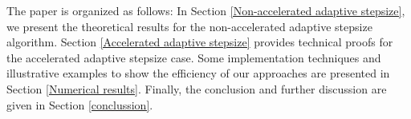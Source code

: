 \documentclass[11pt, a4paper, oneside, reqno]{amsart}
\begin{document}

The paper is organized as follows: In Section \ref{Non-accelerated adaptive stepsize}, we present the theoretical results for the non-accelerated adaptive stepsize algorithm. Section \ref{Accelerated adaptive stepsize} provides technical proofs for the accelerated adaptive stepsize case. Some implementation techniques and illustrative examples to show the efficiency of our approaches are presented in Section \ref{Numerical results}. Finally, the conclusion and further discussion are given in Section \ref{conclussion}.
\end{document}
